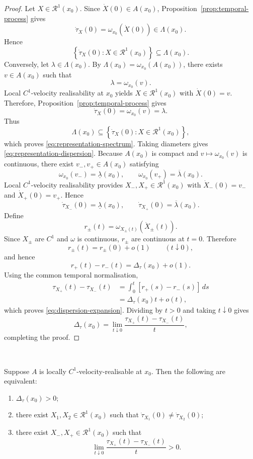 \documentclass[graybox,natbib]{SNmult}
\providecommand{\1}{}
\renewcommand{\1}{\mathbbm 1}
\begin{document}
\begin{proof}

Let \(X\in\mathcal R^1(x_0)\). Since
\(\dot X(0)\in A(x_0)\), Proposition~\ref{prop:temporal-process} gives
\[
\dot\tau_X(0)
=
\omega_{x_0}\!\left(\dot X(0)\right)
\in\Lambda(x_0).
\]
Hence
\[
\left\{
\dot\tau_X(0):
X\in\mathcal R^1(x_0)
\right\}
\subseteq
\Lambda(x_0).
\]
Conversely, let \(\lambda\in\Lambda(x_0)\). By
\(\Lambda(x_0)=\omega_{x_0}(A(x_0))\), there exists
\(v\in A(x_0)\) such that
\[
\lambda=\omega_{x_0}(v).
\]
Local \(C^1\)-velocity realisability at \(x_0\) yields
\(X\in\mathcal R^1(x_0)\) with \(\dot X(0)=v\). Therefore,
Proposition~\ref{prop:temporal-process} gives
\[
\dot\tau_X(0)
=
\omega_{x_0}(v)
=
\lambda.
\]
Thus
\[
\Lambda(x_0)
\subseteq
\left\{
\dot\tau_X(0):
X\in\mathcal R^1(x_0)
\right\},
\]
which proves \eqref{eq:representation-spectrum}. Taking diameters gives
\eqref{eq:representation-dispersion}. Because \(A(x_0)\) is compact and
\(v\mapsto\omega_{x_0}(v)\) is continuous, there exist
\(v_-,v_+\in A(x_0)\) satisfying
\[
\omega_{x_0}(v_-)
=
\underline\lambda(x_0),
\qquad
\omega_{x_0}(v_+)
=
\overline\lambda(x_0).
\]
Local \(C^1\)-velocity realisability provides
\(X_-,X_+\in\mathcal R^1(x_0)\) with
\(\dot X_-(0)=v_-\) and \(\dot X_+(0)=v_+\). Hence
\[
\dot\tau_{X_-}(0)
=
\underline\lambda(x_0),
\qquad
\dot\tau_{X_+}(0)
=
\overline\lambda(x_0).
\]
Define
\[
r_\pm(t)
=
\omega_{X_\pm(t)}
\!\left(\dot X_\pm(t)\right).
\]
Since \(X_\pm\) are \(C^1\) and \(\omega\) is continuous,
\(r_\pm\) are continuous at \(t=0\). Therefore
\[
r_\pm(t)=r_\pm(0)+o(1)
\qquad
(t\downarrow0),
\]
and hence
\[
r_+(t)-r_-(t)
=
\Delta_\tau(x_0)+o(1).
\]
Using the common temporal normalisation,
\[
\begin{aligned}
\tau_{X_+}(t)-\tau_{X_-}(t)
&=
\int_0^t
\left[r_+(s)-r_-(s)\right]\,ds \\
&=
\Delta_\tau(x_0)t+o(t),
\end{aligned}
\]
which proves \eqref{eq:dispersion-expansion}. Dividing by \(t>0\) and taking
\(t\downarrow0\) gives
\[
\Delta_\tau(x_0)
=
\lim_{t\downarrow0}
\frac{\tau_{X_+}(t)-\tau_{X_-}(t)}{t},
\]
completing the proof.
\end{proof}



\ 
\begin{corollary}
\label{cor:temporal-multiplicity}

Suppose \(A\) is locally \(C^1\)-velocity-realisable at \(x_0\). Then the
following are equivalent:
\begin{enumerate}
\item \(\Delta_\tau(x_0)>0\);
\item there exist \(X_1,X_2\in\mathcal R^1(x_0)\) such that
\(\dot\tau_{X_1}(0)\neq\dot\tau_{X_2}(0)\);
\item there exist \(X_-,X_+\in\mathcal R^1(x_0)\) such that
\[
\lim_{t\downarrow0}
\frac{\tau_{X_+}(t)-\tau_{X_-}(t)}{t}>0.
\]
\end{enumerate}
\end{corollary}
\end{document}
